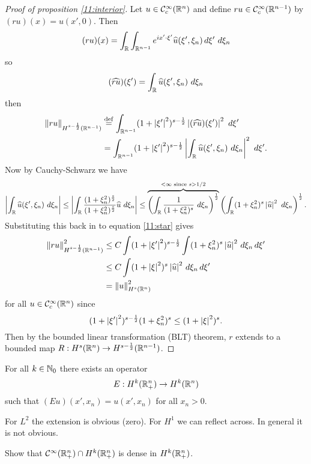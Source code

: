 \begin{proof}[Proof of proposition \ref{11:interior}]
  Let $u\in\mathcal{C}_c^\infty(\mathbb{R}^n)$ and define $ru\in\mathcal{C}_c^\infty(\mathbb{R}^{n-1})$ by $(ru)(x)=u(x',0)$.
  Then
  \[ (ru)(x) = \int_{\mathbb{R}} \int_{\mathbb{R}^{n-1}} e^{ix'\cdot\xi'} \widehat u(\xi',\xi_n) \, d\xi' \ d\xi_n \]
  so
  \[ (\wh{ru})(\xi') = \int_\RR \wh u(\xi',\xi_n) \ d\xi_n \]
  then
  \begin{align}
    \left\lVert ru \right\rVert_{H^{s-\frac12}(\mathbb{R}^{n-1})} &\overset{\mathrm{def}}{=} \int_{\mathbb{R}^{n-1}} (1+\left\lvert \xi' \right\rvert^2)^{s-\frac12} \left\lvert (\widehat{ru})(\xi') \right\rvert^2 \ d\xi' \nonumber \\
    &= \int_{\mathbb{R}^{n-1}} (1+\left\lvert \xi' \right\rvert^2)^{s-\frac12} \left\lvert \int_{\mathbb{R}} \widehat u(\xi',\xi_n) \ d\xi_n \right\rvert^2 \ d\xi'. \label{11:star}
  \end{align}
  Now by Cauchy-Schwarz we have\vspace{-0.5cm}
  \[ \abs{\int_\RR \wh u(\xi',\xi_n) \ d\xi_n} \leq \abs{\int_\RR\frac{(1+\xi_n^2)^\frac s2}{(1+\xi_n^2)^\frac s2} \wh u \ d\xi_n} \leq \overbrace{\left( \int_\RR \frac{1}{(1+\xi_n^2)^s} \ d\xi_n \right)^\frac12}^{<\infty \text{ since } s>1/2} \left( \int_\RR (1+\xi_n^2)^s \abs{\wh u}^2 \ d\xi_n \right)^\frac12. \]
  Substituting this back in to equation \ref{11:star} gives
  \begin{align*}
    \left\lVert ru \right\rVert_{H^{s-\frac12}(\mathbb{R}^{n-1})}^2 &\leq C \int (1+\left\lvert \xi' \right\rvert^2)^{s-\frac12} \int (1+\xi_n^2)^s \left\lvert \widehat u \right\rvert^2 \, d\xi_n \, d\xi' \\
    &\leq C \int (1+\left\lvert \xi \right\rvert^2)^s \left\lvert \widehat u \right\rvert^2 \, d\xi_n \, d\xi' \\
    &= \left\lVert u \right\rVert_{H^s(\mathbb{R}^n)}^2
  \end{align*}
  for all $u\in\mathcal{C}_c^\infty(\mathbb{R}^n)$ since
  \[ (1+\left\lvert \xi' \right\rvert^2)^{s-\frac12}(1+\xi_n^2)^s \leq (1+\left\lvert \xi \right\rvert^2)^s. \]
  Then by the bounded linear transformation (BLT) theorem, $r$ extends to a bounded map $R: H^s(\mathbb{R}^n) \to H^{s-\frac12}(\mathbb{R}^{n-1})$.
\end{proof}

\begin{prop}\label{11:extension}
  For all $k\in\mathbb{N}_0$ there exists an operator
  \[ E: H^k(\mathbb{R}_+^n) \to H^k(\mathbb{R}^n) \]
  such that $(Eu)(x',x_n)=u(x',x_n)$ for all $x_n>0$.
\end{prop}

For $L^2$ the extension is obvious (zero).
For $H^1$ we can reflect across.
In general it is not obvious.

\begin{exer}
  Show that $\mathcal{C}^\infty(\mathbb{R}_+^n) \cap H^k(\mathbb{R}_+^n)$ is dense in $H^k(\mathbb{R}_+^n)$.
\end{exer}

